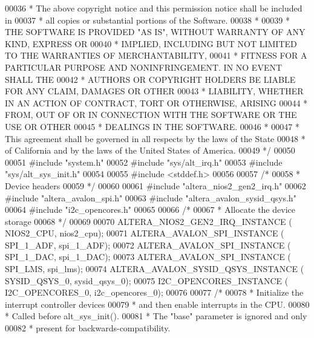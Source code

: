 \begin{DoxyCode}
00036 \textcolor{comment}{ * The above copyright notice and this permission notice shall be included in}
00037 \textcolor{comment}{ * all copies or substantial portions of the Software.}
00038 \textcolor{comment}{ *}
00039 \textcolor{comment}{ * THE SOFTWARE IS PROVIDED "AS IS", WITHOUT WARRANTY OF ANY KIND, EXPRESS OR}
00040 \textcolor{comment}{ * IMPLIED, INCLUDING BUT NOT LIMITED TO THE WARRANTIES OF MERCHANTABILITY,}
00041 \textcolor{comment}{ * FITNESS FOR A PARTICULAR PURPOSE AND NONINFRINGEMENT. IN NO EVENT SHALL THE}
00042 \textcolor{comment}{ * AUTHORS OR COPYRIGHT HOLDERS BE LIABLE FOR ANY CLAIM, DAMAGES OR OTHER}
00043 \textcolor{comment}{ * LIABILITY, WHETHER IN AN ACTION OF CONTRACT, TORT OR OTHERWISE, ARISING}
00044 \textcolor{comment}{ * FROM, OUT OF OR IN CONNECTION WITH THE SOFTWARE OR THE USE OR OTHER}
00045 \textcolor{comment}{ * DEALINGS IN THE SOFTWARE.}
00046 \textcolor{comment}{ *}
00047 \textcolor{comment}{ * This agreement shall be governed in all respects by the laws of the State}
00048 \textcolor{comment}{ * of California and by the laws of the United States of America.}
00049 \textcolor{comment}{ */}
00050 
00051 \textcolor{preprocessor}{#include "system.h"}
00052 \textcolor{preprocessor}{#include "sys/alt_irq.h"}
00053 \textcolor{preprocessor}{#include "sys/alt_sys_init.h"}
00054 
00055 \textcolor{preprocessor}{#include <stddef.h>}
00056 
00057 \textcolor{comment}{/*}
00058 \textcolor{comment}{ * Device headers}
00059 \textcolor{comment}{ */}
00060 
00061 \textcolor{preprocessor}{#include "altera_nios2_gen2_irq.h"}
00062 \textcolor{preprocessor}{#include "altera_avalon_spi.h"}
00063 \textcolor{preprocessor}{#include "altera_avalon_sysid_qsys.h"}
00064 \textcolor{preprocessor}{#include "i2c\_opencores.h"}
00065 
00066 \textcolor{comment}{/*}
00067 \textcolor{comment}{ * Allocate the device storage}
00068 \textcolor{comment}{ */}
00069 
00070 ALTERA_NIOS2_GEN2_IRQ_INSTANCE ( NIOS2\_CPU, nios2\_cpu);
00071 ALTERA_AVALON_SPI_INSTANCE ( SPI\_1\_ADF, spi\_1\_ADF);
00072 ALTERA_AVALON_SPI_INSTANCE ( SPI\_1\_DAC, spi\_1\_DAC);
00073 ALTERA_AVALON_SPI_INSTANCE ( SPI\_LMS, spi\_lms);
00074 ALTERA_AVALON_SYSID_QSYS_INSTANCE ( SYSID\_QSYS\_0, sysid\_qsys\_0);
00075 I2C_OPENCORES_INSTANCE ( I2C\_OPENCORES\_0, i2c\_opencores\_0);
00076 
00077 \textcolor{comment}{/*}
00078 \textcolor{comment}{ * Initialize the interrupt controller devices}
00079 \textcolor{comment}{ * and then enable interrupts in the CPU.}
00080 \textcolor{comment}{ * Called before alt\_sys\_init().}
00081 \textcolor{comment}{ * The "base" parameter is ignored and only}
00082 \textcolor{comment}{ * present for backwards-compatibility.}

\end{DoxyCode}
